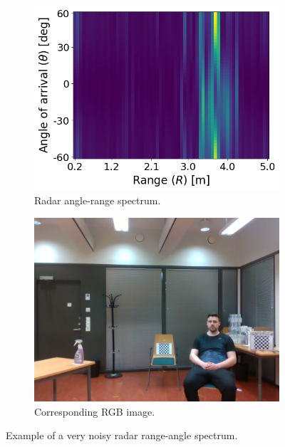 \begin{figure}[h]
    \centering
    \begin{subfigure}[t]{0.49\textwidth}
        \includegraphics[width=\textwidth]{fig/5/bad-spectrum-example-radar.png}
        \caption{Radar angle-range spectrum.}
    \end{subfigure}
    \hfill
    \begin{subfigure}[t]{0.49\textwidth}
        \includegraphics[width=\textwidth]{fig/5/bad-spectrum-example-rgb.png}
        \caption{Corresponding RGB image.}
    \end{subfigure}
    \caption{Example of a very noisy radar range-angle spectrum.}
    \label{fig:bad-radar-example}
\end{figure}